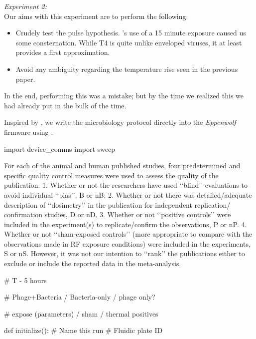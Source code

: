 \documentclass[paper.tex]{subfiles}%
\begin{document}
\clearpage
{\Large \it Experiment 2:}\\


Our aims with this experiment are to perform the following:

\begin{itemize}
\item Crudely test the pulse hypothesis. \cite{Efficient2015}'s use of a 15 minute exposure caused us some consternation.
    While T4 is quite unlike enveloped viruses, it at least provides a first approximation.
\item Avoid any ambiguity regarding the temperature rise seen in the previous paper.
\end{itemize}


In the end, performing this was a mistake; but by the time we realized this we had already put in the bulk of the time.


Inspired by \cite{Biocoder2010}, we write the microbiology protocol directly into the {\it Eppenwolf} firmware using \cite{Noweb}.



\endmoddef\nwstartdeflinemarkup\nwenddeflinemarkup
import device_comms
import sweep

\nwendcode{}\nwdocspar

For each of the animal and human published studies, four
predetermined and specific quality control measures were used to
assess the quality of the publication.
1. Whether or not the researchers have used ‘‘blind’’ evaluations to
avoid individual ‘‘bias’’, B or nB;
2. Whether or not there was detailed/adequate description of
‘‘dosimetry’’ in the publication for independent replication/
confirmation studies, D or nD.
3. Whether or not ‘‘positive controls’’ were included in the
experiment(s) to replicate/confirm the observations, P or nP.
4. Whether or not ‘‘sham-exposed controls’’ (more appropriate to
compare with the observations made in RF exposure conditions)
were included in the experiments, S or nS. However, it was not our
intention to ‘‘rank’’ the publications either to exclude or include
the reported data in the meta-analysis.


# T - 5 hours


# Phage+Bacteria / Bacteria-only / phage only?

# expose (parameters) / sham / thermal positives


def initialize():
    # Name this run
    # Fluidic plate ID
\end{document}

